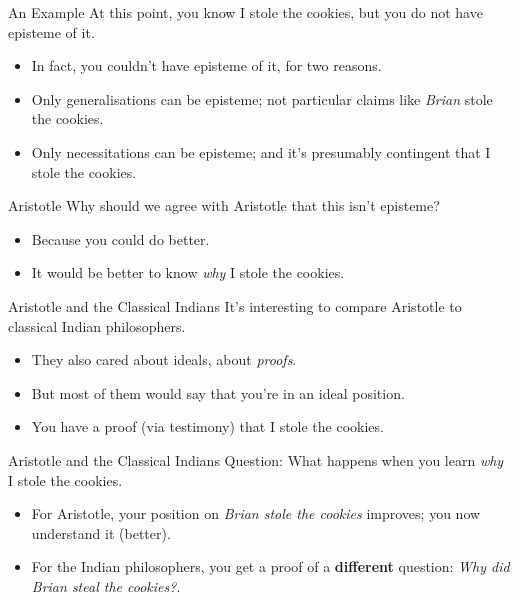 \documentclass[
  17pt,
  letterpaper,
  ignorenonframetext,
  aspectratio=169,
  handout]{beamer}
\providecommand{\tightlist}{%
  \setlength{\itemsep}{0pt}\setlength{\parskip}{0pt}}\usepackage{longtable,booktabs,array}
\begin{document}
\begin{frame}{An Example}
\protect\hypertarget{an-example-1}{}
At this point, you know I stole the cookies, but you do not have
episteme of it.

\begin{itemize}[<+->]
\tightlist
\item
  In fact, you couldn't have episteme of it, for two reasons.
\item
  Only generalisations can be episteme; not particular claims like
  \emph{Brian} stole the cookies.
\item
  Only necessitations can be episteme; and it's presumably contingent
  that I stole the cookies.
\end{itemize}
\end{frame}

\begin{frame}{Aristotle}
\protect\hypertarget{aristotle-1}{}
Why should we agree with Aristotle that this isn't episteme?

\begin{itemize}[<+->]
\tightlist
\item
  Because you could do better.
\item
  It would be better to know \emph{why} I stole the cookies.
\end{itemize}
\end{frame}

\begin{frame}{Aristotle and the Classical Indians}
\protect\hypertarget{aristotle-and-the-classical-indians}{}
It's interesting to compare Aristotle to classical Indian philosophers.

\begin{itemize}[<+->]
\tightlist
\item
  They also cared about ideals, about \emph{proofs}.
\item
  But most of them would say that you're in an ideal position.
\item
  You have a proof (via testimony) that I stole the cookies.
\end{itemize}
\end{frame}

\begin{frame}{Aristotle and the Classical Indians}
\protect\hypertarget{aristotle-and-the-classical-indians-1}{}
Question: What happens when you learn \emph{why} I stole the cookies.

\begin{itemize}[<+->]
\tightlist
\item
  For Aristotle, your position on \emph{Brian stole the cookies}
  improves; you now understand it (better).
\item
  For the Indian philosophers, you get a proof of a \textbf{different}
  question: \emph{Why did Brian steal the cookies?}.
\end{itemize}
\end{frame}
\end{document}
